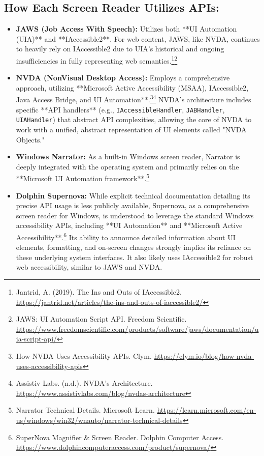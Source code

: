 \subsection*{How Each Screen Reader Utilizes APIs:}
\begin{itemize}[leftmargin=*,noitemsep,topsep=0pt]
    \item \textbf{JAWS (Job Access With Speech):} Utilizes both **UI Automation (UIA)** and **IAccessible2**. For web content, JAWS, like NVDA, continues to heavily rely on IAccessible2 due to UIA's historical and ongoing insufficiencies in fully representing web semantics.\footnote{Jantrid, A. (2019). The Ins and Outs of IAccessible2. \url{https://jantrid.net/articles/the-ins-and-outs-of-iaccessible2/}}\footnote{JAWS: UI Automation Script API. Freedom Scientific. \url{https://www.freedomscientific.com/products/software/jaws/documentation/uia-script-api/}}
    \item \textbf{NVDA (NonVisual Desktop Access):} Employs a comprehensive approach, utilizing **Microsoft Active Accessibility (MSAA), IAccessible2, Java Access Bridge, and UI Automation**.\footnote{How NVDA Uses Accessibility APIs. Clym. \url{https://clym.io/blog/how-nvda-uses-accessibility-apis}}\footnote{Assistiv Labs. (n.d.). NVDA's Architecture. \url{https://www.assistivlabs.com/blog/nvdas-architecture}} NVDA's architecture includes specific **API handlers** (e.g., \texttt{IAccessibleHandler}, \texttt{JABHandler}, \texttt{UIAHandler}) that abstract API complexities, allowing the core of NVDA to work with a unified, abstract representation of UI elements called "NVDA Objects."
    \item \textbf{Windows Narrator:} As a built-in Windows screen reader, Narrator is deeply integrated with the operating system and primarily relies on the **Microsoft UI Automation framework**.\footnote{Narrator Technical Details. Microsoft Learn. \url{https://learn.microsoft.com/en-us/windows/win32/wnauto/narrator-technical-details}}
    \item \textbf{Dolphin Supernova:} While explicit technical documentation detailing its precise API usage is less publicly available, Supernova, as a comprehensive screen reader for Windows, is understood to leverage the standard Windows accessibility APIs, including **UI Automation** and **Microsoft Active Accessibility**.\footnote{SuperNova Magnifier \& Screen Reader. Dolphin Computer Access. \url{https://www.dolphincomputeraccess.com/product/supernova/}} Its ability to announce detailed information about UI elements, formatting, and on-screen changes strongly implies its reliance on these underlying system interfaces. It also likely uses IAccessible2 for robust web accessibility, similar to JAWS and NVDA.
\end{itemize}

